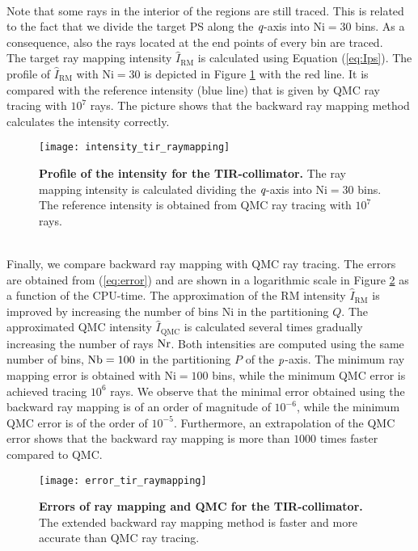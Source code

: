 \\ \indent Note that some rays in the interior of the regions are still traced. This is related to the fact that we divide the target PS along the $\textit{q}$-axis into $\textrm{Ni}=30$ bins. As a consequence, also the rays located at the end points of every bin are traced. \\
\indent The target ray mapping intensity $\hat{I}_{\textrm{RM}}$ is calculated using Equation (\ref{eq:Ips}). The profile of $\hat{I}_{\textrm{RM}}$ with $\textrm{Ni}=30$ is depicted in Figure \ref{fig:intensity_tir_raymapping} with the red line. It is compared with the reference intensity (blue line) that is given by QMC ray tracing with $10^7$ rays. The picture shows that the backward ray mapping method calculates the intensity correctly.
\begin{figure}[t]
  \begin{center}
  \texttt{[image: intensity\_tir\_raymapping]}
  \end{center}
  \caption{\textbf{Profile of the intensity for the TIR-collimator.}
 The ray mapping intensity is calculated dividing the $\textit{q}$-axis into $\textrm{Ni}=30$ bins. The reference intensity is obtained from QMC ray tracing with $10^7$ rays.}
\label{fig:intensity_tir_raymapping}
 \end{figure}
\\ \indent 
Finally, we compare backward ray mapping with QMC ray tracing. The errors are obtained from (\ref{eq:error}) and are shown in a logarithmic scale in Figure \ref{fig:error_tir_raymapping} as a function of the CPU-time. The approximation of the RM intensity $\hat{I}_{\textrm{RM}}$ is improved by increasing the number of bins $\textrm{Ni}$ in the partitioning $Q$. The approximated QMC intensity $\hat{I}_{\textrm{QMC}}$ is calculated several times gradually increasing the number of rays $\textrm{Nr}$. Both intensities are computed using the same number of bins, $\textrm{Nb}=100$ in the partitioning $P$ of the $\textit{p}$-axis. The minimum ray mapping error is obtained with $\textrm{Ni}=100$ bins, while the minimum QMC error is achieved tracing $10^6$ rays. We observe that the minimal error obtained using the backward ray mapping is of an order of magnitude of $10^{-6}$, while the minimum QMC error is of the order of $10^{-5}$. Furthermore, an extrapolation of the QMC error shows that the backward ray mapping is more than $1000$ times faster compared to QMC.
\begin{figure}[t]
  \begin{center}
  \texttt{[image: error\_tir\_raymapping]}
  \end{center}
  \caption{\textbf{Errors of ray mapping and QMC for the TIR-collimator.}
 The extended backward ray mapping method is faster and more accurate than QMC ray tracing.}
\label{fig:error_tir_raymapping}
 \end{figure}
